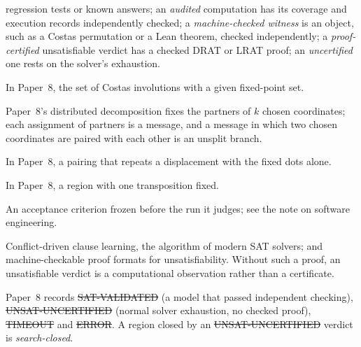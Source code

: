 \begin{description}[style=nextline,leftmargin=0pt,itemsep=2pt]
regression tests or known answers; an \emph{audited} computation has its coverage and execution
records independently checked; a \emph{machine-checked witness} is an object, such as a Costas
permutation or a Lean theorem, checked independently; a \emph{proof-certified} unsatisfiable verdict
has a checked DRAT or LRAT proof; an \emph{uncertified} one rests on the solver's exhaustion.
\item[Region] In Paper~8, the set of Costas involutions with a given fixed-point set.
\item[Native split, message, unsplit branch] Paper~8's distributed decomposition fixes the partners
of $k$ chosen coordinates; each assignment of partners is a message, and a message in which two
chosen coordinates are paired with each other is an unsplit branch.
\item[Seed-refuted] In Paper~8, a pairing that repeats a displacement with the fixed dots alone.
\item[Case] In Paper~8, a region with one transposition fixed.
\item[Gate] An acceptance criterion frozen before the run it judges; see the note on software
engineering.
\item[CDCL, DRAT and LRAT] Conflict-driven clause learning, the algorithm of modern SAT solvers; and
machine-checkable proof formats for unsatisfiability. Without such a proof, an unsatisfiable verdict
is a computational observation rather than a certificate.
\item[Verdicts] Paper~8 records \st{SAT-VALIDATED} (a model that passed independent checking),
\st{UNSAT-UNCERTIFIED} (normal solver exhaustion, no checked proof), \st{TIMEOUT} and \st{ERROR}. A
region closed by an \st{UNSAT-UNCERTIFIED} verdict is \emph{search-closed}.
\end{description}
